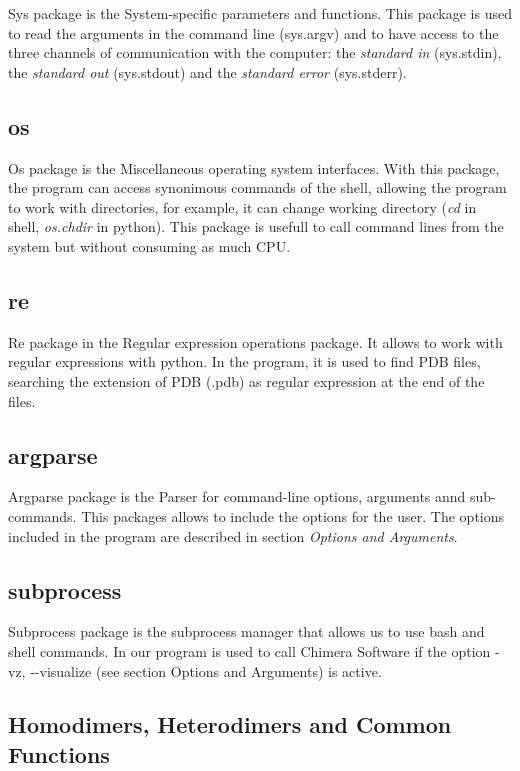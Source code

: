 \documentclass[a4paper,10pt]{report}
\begin{document}
Sys package is the System-specific parameters and functions. This package is used to read the arguments in the command line (sys.argv) and to have access to the three channels of communication with the computer: the \textit{standard in} (sys.stdin), the \textit{standard out} (sys.stdout) and the \textit{standard error} (sys.stderr).

\subsection{os}

Os package is the Miscellaneous operating system interfaces. With this package, the program can access synonimous commands of the shell, allowing the program to work with directories, for example, it can change working directory (\textit{cd} in shell, \textit{os.chdir} in python). 
This package is usefull to call command lines from the system but without consuming as much CPU.

\subsection{re}

Re package in the Regular expression operations package. It allows to work with regular expressions with python. In the program, it is used to find PDB files, searching the extension of PDB (.pdb) as regular expression at the end of the files.


\subsection{argparse}

Argparse package is the Parser for command-line options, arguments annd sub-commands. This packages allows to include the options for the user. The options included in the program are described in section \textit{Options and Arguments}.

\subsection{subprocess}

Subprocess package is the subprocess manager that allows us to use bash and shell commands. In our program is used to call Chimera Software if the option -vz, -{}-visualize (see section Options and Arguments) is active.

\subsection{Homodimers, Heterodimers and Common Functions}
\end{document}
